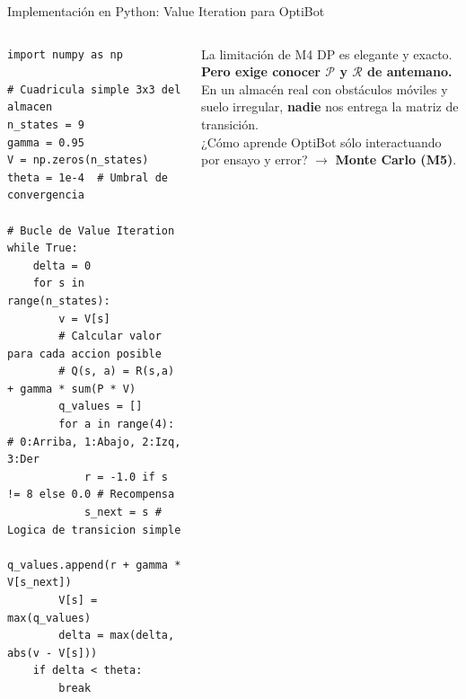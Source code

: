 \begin{frame}[fragile]{Implementación en Python: Value Iteration para OptiBot}
  \begin{columns}[T,onlytextwidth]
\begin{lstlisting}[style=rlcode]
import numpy as np

# Cuadricula simple 3x3 del almacen
n_states = 9
gamma = 0.95
V = np.zeros(n_states)
theta = 1e-4  # Umbral de convergencia

# Bucle de Value Iteration
while True:
    delta = 0
    for s in range(n_states):
        v = V[s]
        # Calcular valor para cada accion posible
        # Q(s, a) = R(s,a) + gamma * sum(P * V)
        q_values = []
        for a in range(4): # 0:Arriba, 1:Abajo, 2:Izq, 3:Der
            r = -1.0 if s != 8 else 0.0 # Recompensa
            s_next = s # Logica de transicion simple
            q_values.append(r + gamma * V[s_next])
        V[s] = max(q_values)
        delta = max(delta, abs(v - V[s]))
    if delta < theta:
        break
\end{lstlisting}
      \begin{alertblock}{La limitación de M4}
        DP es elegante y exacto.\\
        \vspace{0.2cm}
        \textbf{Pero exige conocer $\mathcal{P}$ y $\mathcal{R}$ de antemano.}\\
        \vspace{0.2cm}
        En un almacén real con obstáculos móviles y suelo irregular, \textbf{nadie} nos entrega la matriz de transición.\\
        \vspace{0.2cm}
        ¿Cómo aprende OptiBot sólo interactuando por ensayo y error? $\to$ \textbf{Monte Carlo (M5)}.
      \end{alertblock}
  \end{columns}
\end{frame}
